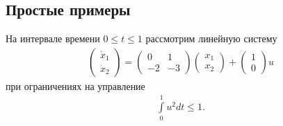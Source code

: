 \documentclass[../main.tex]{subfiles}
\begin{document}
  \subsection{Простые примеры}
  На интервале времени $ 0 \leqslant t \leqslant 1$ рассмотрим линейную систему 
  \begin{gather*}
  	\begin{pmatrix} 
  		\dot{x}_1 \\
  		\dot{x}_2  
  	\end{pmatrix} = 
  	\begin{pmatrix}
  		0 & 1 \\
  		-2 & -3
  	\end{pmatrix}
  	\begin{pmatrix} 
  		x_1 \\
  		x_2  
  	\end{pmatrix} +
  	\begin{pmatrix} 1 \\ 0
  	\end{pmatrix} u
  \end{gather*}
  при ограничениях на управление 
  \begin{gather*}
  	\int\limits_0^1 u^2dt \leqslant 1.
  \end{gather*}
\end{document}
